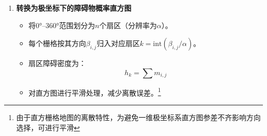 \documentclass[../main.tex]{subfiles}
\begin{document}
\begin{enumerate}
\begin{itemize}
\begin{enumerate}
                    
                    \item \textbf{转换为极坐标下的障碍物概率直方图}  
                        \begin{itemize}
                            \item {\small\kaishu 将0°–360°范围划分为$n$个扇区（分辨率为$\alpha$）。}  
                            \item {\small\kaishu 每个栅格按其方向$\beta_{i,j}$归入对应扇区$k = \text{int}(\beta_{i,j}/\alpha)$。  }
                            \item {\small\kaishu 扇区障碍密度为：}
                                \[
                                h_k = \sum m_{i,j}
                                \]
                            \item {\small\kaishu 对直方图进行平滑处理，减少离散误差。\footnote{由于直方栅格地图的离散特性，为避免一维极坐标系直方图参差不齐影响方向选择，可进行平滑}}  
                        \end{itemize}
                    

\end{enumerate}
\end{itemize}
\end{enumerate}
\end{document}
